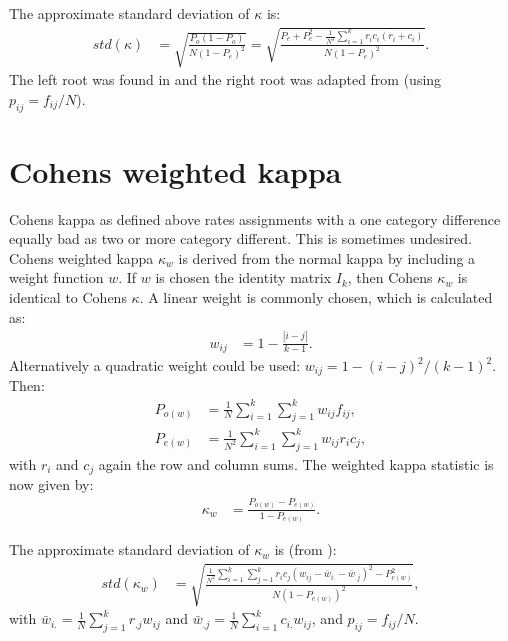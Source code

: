 \documentclass[]{article}
\begin{document}
The approximate standard deviation of $\kappa$ is:
\begin{align}
\mathit{std}(\kappa) &= \sqrt{ \frac{P_o ( 1 - P_o )}{N ( 1 - P_e
)^2} } = \sqrt{ \frac{P_e + P_e^2 - \frac{1}{N^3} \sum_{i=1}^k r_i
c_i (r_i + c_i)}{N ( 1 - P_e )^2}}.
\end{align}
The left root was found in \cite{Altman91} and the right root was
adapted from \cite{LandisEA77} (using $p_{ij} = f_{ij} / N$).


\section{Cohens weighted kappa}\label{sec:CohenWeighted}

Cohens kappa as defined above rates assignments with a one category
difference equally bad as two or more category different. This is
sometimes undesired. Cohens weighted kappa $\kappa_w$ is derived from
the normal kappa by including a weight function $w$. If $w$ is chosen
the identity matrix $I_k$, then Cohens $\kappa_w$ is identical to
Cohens $\kappa$. A linear weight is commonly chosen, which is
calculated as:
\begin{align}
w_{ij} &= 1 - \frac{|i-j|}{k-1}.
\end{align}
Alternatively a quadratic weight could be used: $w_{ij} = 1 - (i-j)^2
/ (k-1)^2$. Then:
\begin{align}
P_{o(w)} &= \frac{1}{N} \sum_{i = 1}^k \sum_{j = 1}^k w_{ij} f_{ij}, \\
P_{e(w)} &= \frac{1}{N^2} \sum_{i = 1}^k \sum_{j = 1}^k w_{ij} r_i
c_j,
\end{align}
with $r_i$ and $c_j$ again the row and column sums. The weighted
kappa statistic is now given by:
\begin{align}
\kappa_w &= \frac{P_{o(w)} - P_{e(w)}}{1 -
P_{e(w)}}.\label{eq:kappa_w}
\end{align}

The approximate standard deviation of $\kappa_w$ is (from
\cite{Fleiss81}):
\begin{align}
\mathit{std}(\kappa_w) &= \sqrt{ \frac{ \frac{1}{N^2} \sum_{i=1}^k
\sum_{j=1}^k r_i c_j (w_{ij} - \bar w_{i.} - \bar w_{.j})^2 -
P_{e(w)}^2}{N ( 1 - P_{e(w)} )^2}},\label{eq:stdCohenkw}
\end{align}
with $\bar w_{i.} = \frac{1}{N} \sum_{j=1}^k r_{.j} w_{ij}$ and $\bar
w_{.j} = \frac{1}{N} \sum_{i=1}^k c_{i.} w_{ij}$, and $p_{ij} =
f_{ij} / N$.
\end{document}
